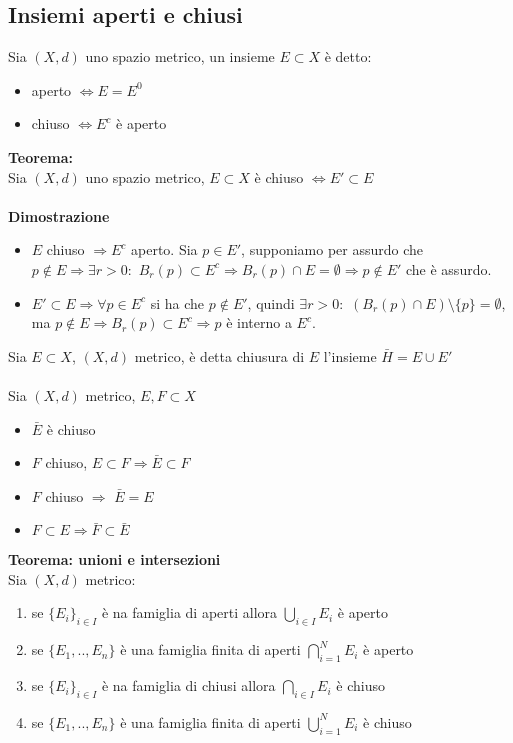 \documentclass{article}
\begin{document}
\subsection{Insiemi aperti e chiusi}
Sia $(X,d)$ uno spazio metrico, un insieme $E\subset X$ è detto:
\begin{itemize}
    \item aperto $\Leftrightarrow E=E^0$
    \item chiuso $\Leftrightarrow E^c$ è aperto
\end{itemize}
\textbf{Teorema:}\\
Sia $(X,d)$ uno spazio metrico, $E\subset X$ è chiuso $\Leftrightarrow E'\subset E$\\\\
\textbf{Dimostrazione}
\begin{itemize}
    \item $E$ chiuso $\Rightarrow E^c$ aperto. Sia $p\in E'$, supponiamo per assurdo che $p\notin E\Rightarrow\exists r>0:$ $B_r(p)\subset E^c\Rightarrow B_r(p)\cap E=\emptyset\Rightarrow p\notin E'$ che è assurdo.
    \item $E'\subset E \Rightarrow \forall p\in E^c$ si ha che $p\notin E'$, quindi $\exists r>0:$ $(B_r(p)\cap E)\setminus\{p\}=\emptyset$, ma $p\notin E\Rightarrow B_r(p)\subset E^c\Rightarrow p$ è interno a $E^c$.
\end{itemize}
Sia $E\subset X$, $(X,d)$ metrico, è detta chiusura di $E$ l'insieme $\bar{H}=E\cup E'$\\\\
Sia $(X,d)$ metrico, $E,F\subset X$
\begin{itemize}
    \item $\bar{E}$ è chiuso
    \item $F$ chiuso, $E\subset F\Rightarrow \bar{E}\subset F$
    \item $F$ chiuso $\Rightarrow$ $\bar{E}=E$
    \item $F\subset E\Rightarrow \bar{F}\subset\bar{E}$
\end{itemize}
\textbf{Teorema: unioni e intersezioni}\\
Sia $(X,d)$ metrico:
\begin{enumerate}
    \item se $\{E_i\}_{i\in I}$ è na famiglia di aperti allora $\bigcup_{i\in I}E_i$ è aperto
    \item se $\{E_1,..,E_n\}$ è una famiglia finita di aperti $\bigcap_{i=1}^N E_i$ è aperto
    \item se $\{E_i\}_{i\in I}$ è na famiglia di chiusi allora $\bigcap_{i\in I}E_i$ è chiuso
    \item se $\{E_1,..,E_n\}$ è una famiglia finita di aperti $\bigcup_{i=1}^N E_i$ è chiuso
\end{enumerate}
\end{document}
